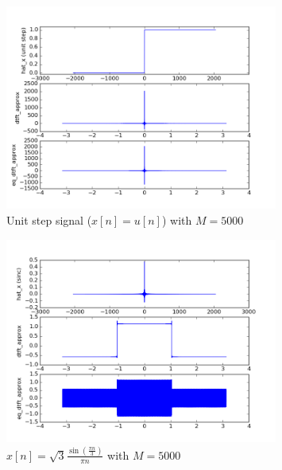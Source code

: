\begin{figure}[htbp]
	\centering
	\includegraphics[width=0.8\textwidth]{images/p6-4-5000}
	\caption{Unit step signal ($x[n]=u[n]$) with $M=5000$}
	\label{fig:p6-4-5000}
\end{figure}

\begin{figure}[htbp]
	\centering
	\includegraphics[width=0.8\textwidth]{images/p6-5-5000}
	\caption{$x[n] = \sqrt{3}\frac{\sin(\frac{\pi n}{3})}{\pi n}$ with $M=5000$}
	\label{fig:p6-5-5000}
\end{figure}